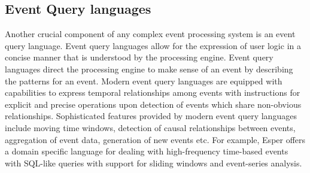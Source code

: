 \subsection{Event Query languages}
Another crucial component of any complex event processing system is an event query language. Event query languages allow for the expression of user logic in a concise manner that is understood by the processing engine. Event query languages direct the processing engine to make sense of an event by describing the patterns for an event. Modern event query languages are equipped with capabilities to express temporal relationships among events with instructions for explicit and precise operations upon detection of events which share non-obvious relationships. Sophisticated features provided by modern event query languages include moving time windows, detection of causal relationships between events, aggregation of event data, generation of new events etc. For example, Esper \cite{Esper} offers a domain specific language for dealing with high-frequency time-based events with SQL-like queries with support for sliding windows and event-series analysis.


